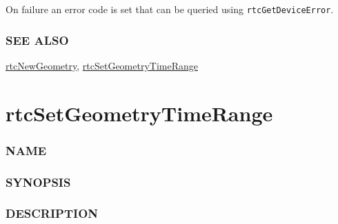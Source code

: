 On failure an error code is set that can be queried using
\texttt{rtcGetDeviceError}.

\subsubsection{SEE ALSO}\label{see-also}

\hyperref[rtcnewgeometry]{rtcNewGeometry},
\hyperref[rtcsetgeometrytimerange]{rtcSetGeometryTimeRange}

\pagebreak

\section{rtcSetGeometryTimeRange}\label{rtcsetgeometrytimerange}

\subsubsection{NAME}\label{name}

\begin{Shaded}
\begin{Highlighting}[]
\OperatorTok{{-}}
\end{Highlighting}
\end{Shaded}

\subsubsection{SYNOPSIS}\label{synopsis}

\begin{Shaded}
\begin{Highlighting}[]

\OperatorTok{(}
\OperatorTok{,}
  \OperatorTok{,}
\OperatorTok{);}
\end{Highlighting}
\end{Shaded}

\subsubsection{DESCRIPTION}\label{description}

